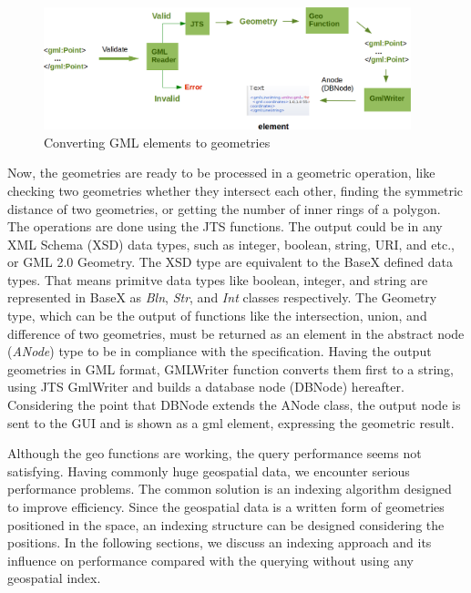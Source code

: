 \documentclass[a4paper,12pt]{article}
\begin{document}
 \begin{figure}
\centering
\includegraphics[width=0.95\textwidth]{GeoModuleProcess}
\caption{Converting GML elements to geometries}
\label{figGeoModuleProcess}
\end{figure}

Now, the geometries are ready to be processed in a geometric operation, like checking two geometries whether they intersect each other, finding the symmetric distance of two geometries, or getting the number of inner rings of a polygon. The operations are done using the JTS functions. The output could be in any XML Schema (XSD) data types, such as integer, boolean, string, URI, and etc., or GML 2.0 Geometry. The XSD type are equivalent to the BaseX defined data types. That means primitve data types like boolean, integer, and string are represented in BaseX as \textit{Bln}, \textit{Str}, and \textit{Int} classes respectively. The Geometry type, which can be the output of functions like the intersection, union, and difference of two geometries, must be returned as an element in the abstract node (\textit{ANode}) type to be in compliance with the specification. Having the output geometries in GML format, GMLWriter function converts them first to a string, using JTS GmlWriter and builds a database node (DBNode) hereafter. Considering the point that DBNode extends the ANode class, the output node is sent to the GUI and is shown as a gml element, expressing the geometric result. 

Although the geo functions are working, the query performance seems not satisfying. Having commonly huge geospatial data, we encounter serious performance problems. The common solution is an indexing algorithm designed to improve efficiency. Since the geospatial data is a written form of geometries positioned in the space, an indexing structure can be designed considering the positions. In the following sections, we discuss an indexing approach and its influence on performance compared with the querying without using any geospatial index.
\end{document}
